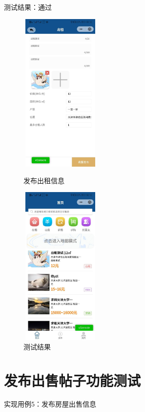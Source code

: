 测试结果：通过
    \begin{figure}[htbp]
        \centering
        \begin{minipage}[t]{0.48\textwidth}
        \centering
        \includegraphics[width=4cm,height=8cm]{test/image/test26.png} 
     
       \caption{发布出租信息} 
        \end{minipage}
        \begin{minipage}[t]{0.48\textwidth}
        \centering
        \includegraphics[width=4cm,height=8cm]{test/image/test27.png}
        \caption{测试结果}
        \end{minipage}
        \end{figure}
 
\section{发布出售帖子功能测试}

实现用例5：发布房屋出售信息

